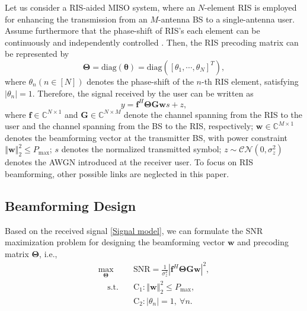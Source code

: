 \documentclass[12pt,draftclsnofoot,journal,onecolumn]{IEEEtran}
\theoremstyle{nonumberplain}
\def \diag {\text{diag}}
\begin{document}
        Let us consider a RIS-aided MISO system, where an $N$-element RIS is employed for enhancing the transmission from an $M$-antenna \ac{BS} to a single-antenna user. Assume furthermore that the phase-shift of RIS's each element can be continuously and independently controlled \cite{wu2019intelligent}. Then, the RIS precoding matrix can be represented by
        \begin{equation}
            \label{RIS}
            \bm \Theta = \diag \left(\bm \theta\right )=\diag \left(\left[\theta_{1},\cdots ,\theta_{N}\right]^{T}\right),
        \end{equation}
        where $\theta_n (n\in[N])$ denotes the phase-shift of the $n$-th RIS element, satisfying $\lvert \theta_n\rvert=1$. Therefore, the signal received by the user can be written as 
        \begin{equation}
            \label{Signal model}
            y=\bm f^{H} \bm\Theta \bm G \bm w s+z,
        \end{equation}
        where $\bm f\in \mathbb C ^{N\times 1}$ and $\bm G \in \mathbb C^{N\times M}$ denote the channel spanning from the RIS to the user and the channel spanning from the BS to the RIS, respectively; $\bm w\in \mathbb C^{M\times 1}$ denotes the beamforming vector at the transmitter BS, with power constraint $\left\Vert \bm w\right \Vert_{2}^{2}\leq P_{\text{max}}$; $s$ denotes the normalized transmitted symbol; $z\sim \mathcal{CN}\left(0,\sigma_{z}^{2}\right)$ denotes the \ac{AWGN} introduced at the receiver user. To focus on RIS beamforming, other possible links are neglected in this paper.
        
        \subsection{Beamforming Design}
        \label{Beamforming design}
        Based on the received signal \eqref{Signal model}, we can formulate the \ac{SNR} maximization problem for designing the beamforming vector $\bm w$ and precoding matrix $\bm \Theta$, i.e.,
        \begin{subequations}
\label{optimization}
\begin{align}
\label{objective}
\max_{\bm \Theta}~~&\text{SNR}=\frac{1}{\sigma_{z}^{2}}
\left\vert
\bm f^{H}\bm \Theta\bm G\bm w \right\vert^{2},\\
\label{constraint}
~~~~~\text{s.t.~~~}&\text{C}_{1}: \left\Vert \bm w\right \Vert_{2}^{2}\leq P_{\text{max}},\\
&\text{C}_{2}: \left\vert\theta_{n}\right\vert=1,~\forall n.
\end{align}
\end{subequations}
        
\end{document}
